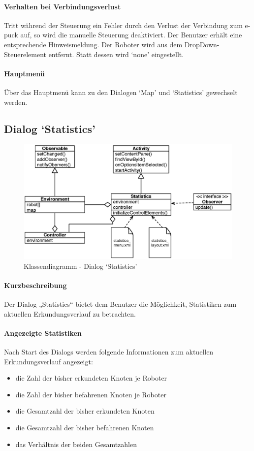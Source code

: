 \documentclass[10pt,a4paper]{article}
\begin{document}
	\paragraph*{Verhalten bei Verbindungsverlust} Tritt während der Steuerung ein Fehler durch den Verlust der Verbindung zum e-puck auf, so wird die
	manuelle Steuerung deaktiviert. Der Benutzer erhält eine entsprechende Hinweismeldung. Der Roboter wird aus dem DropDown-Steuerelement entfernt.
	Statt dessen wird `none' eingestellt.
	
	\paragraph*{Hauptmenü} Über das Hauptmenü kann zu den Dialogen `Map' und `Statistics' gewechselt werden.
	
	\subsection*{Dialog `Statistics'}
	
	\begin{figure}[h]
			\centering
			\includegraphics[width=14cm]{images/entwurf_statistics.eps}
  			\caption{Klassendiagramm - Dialog `Statistics'}
  			\label{fig:dialog_statistics}
  	\end{figure}
	
	\paragraph*{Kurzbeschreibung} Der Dialog „Statistics“ bietet dem Benutzer die Möglichkeit, Statistiken zum aktuellen Erkundungsverlauf zu
	betrachten.
	
	\paragraph*{Angezeigte Statistiken} Nach Start des Dialogs werden folgende Informationen zum aktuellen Erkundungsverlauf angezeigt:
	\begin{itemize}
	\item die Zahl der bisher erkundeten Knoten je Roboter
	\item die Zahl der bisher befahrenen Knoten je Roboter
	\item die Gesamtzahl der bisher erkundeten Knoten
	\item die Gesamtzahl der bisher befahrenen Knoten
	\item das Verhältnis der beiden Gesamtzahlen
	\end{itemize}
	
\end{document}
